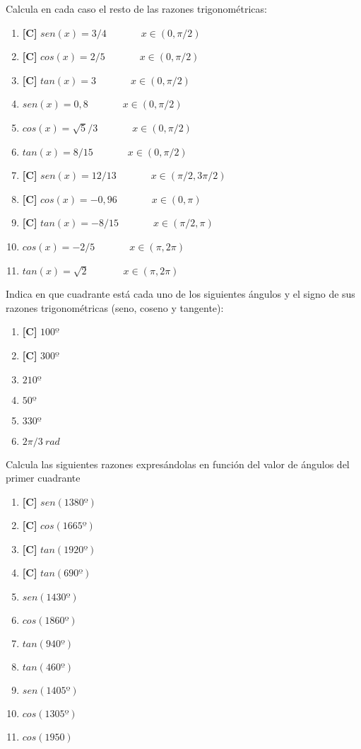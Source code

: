 \Exercicio Calcula en cada caso el resto de las razones trigonométricas:
\begin{enumerate}[topsep=0pt]
	\item \textbf{[C]} $sen(x) = 3/4$~~~~~~~$x \in (0,\pi/2)$
	\item \textbf{[C]} $cos(x) = 2/5$~~~~~~~$x \in (0,\pi/2)$
	\item \textbf{[C]} $tan(x) = 3$~~~~~~~$x \in (0,\pi/2)$
	\item $sen(x) = 0,8$~~~~~~~$x \in (0,\pi/2)$
	\item $cos(x)= \sqrt{5}/3$~~~~~~~$x \in (0,\pi/2)$
	\item $tan(x) = 8/15$~~~~~~~$x \in (0,\pi/2)$
	\item \textbf{[C]} $sen (x)=12/13$~~~~~~~$x \in (\pi/2,3\pi/2)$
	\item \textbf{[C]} $cos(x) = -0,96$~~~~~~~$x \in (0,\pi)$
	\item \textbf{[C]} $tan(x) = -8/15$~~~~~~~$x \in (\pi/2,\pi)$
	\item $cos(x)=-2/5$~~~~~~~$x \in (\pi, 2\pi)$
	\item $tan(x)=\sqrt{2}$~~~~~~~$x \in (\pi, 2\pi)$
\end{enumerate}


\Exercicio Indica en que cuadrante está cada uno de los siguientes ángulos y el signo de sus razones trigonométricas (seno, coseno y tangente):

\begin{enumerate}[topsep=0pt]
	\item \textbf{[C]} $ 100º $
	\item \textbf{[C]} $ 300º $
	\item $ 210º $
	\item $ 50º $
	\item $ 330º $
	\item $ 2\pi/3~rad$

\end{enumerate}

\Exercicio Calcula las siguientes razones expresándolas en función del valor de ángulos del primer cuadrante

\begin{enumerate}[topsep=0pt]
	\item \textbf{[C]} $ sen(1380º) $
	\item \textbf{[C]} $ cos(1665º) $
	\item \textbf{[C]} $ tan(1920º) $
	\item \textbf{[C]} $ tan(690º) $
	\item $ sen(1430º) $
	\item $ cos(1860º) $
	\item $ tan(940º) $
	\item $ tan(460º) $
	\item $ sen(1405º) $
	\item $ cos(1305º) $
	\item $ cos(1950) $
\end{enumerate}


